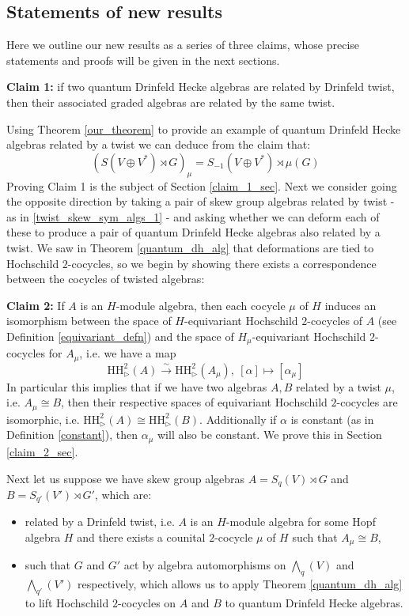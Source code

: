 \documentclass[10pt]{article}
\newcommand{\bb}{\medbreak}
\newcommand{\nt}{\noindent}
\newcommand{\xrt}{\xrightarrow}
\newcommand{\HH}{\text{HH}}
\newcommand{\definex}[1]{\textbf{#1}}
\theoremstyle{definition}
\begin{document}
\subsection{Statements of new results}\label{new_results_sec}

Here we outline our new results as a series of three claims, whose precise statements and proofs will be given in the next sections.\bb

\nt \definex{Claim 1:} if two quantum Drinfeld Hecke algebras are related by Drinfeld twist, then their associated graded algebras are related by the same twist.\bb

\nt Using Theorem \ref{our_theorem} to provide an example of quantum Drinfeld Hecke algebras related by a twist we can deduce from the claim that:
\begin{equation}\label{twist_skew_sym_algs_1}
(S(V\oplus V^*)\rtimes G)_\mu=S_{-1}(V\oplus V^*)\rtimes \mu(G)
\end{equation}
Proving Claim 1 is the subject of Section \ref{claim_1_sec}. Next we consider going the opposite direction by taking a pair of skew group algebras related by twist - as in \eqref{twist_skew_sym_algs_1} - and asking whether we can deform each of these to produce a pair of quantum Drinfeld Hecke algebras also related by a twist. We saw in Theorem \ref{quantum_dh_alg} that deformations are tied to Hochschild $2$-cocycles, so we begin by showing there exists a correspondence between the cocycles of twisted algebras:\bb

\nt \definex{Claim 2:} If $A$ is an $H$-module algebra, then each cocycle $\mu$ of $H$ induces an isomorphism between the space of $H$-equivariant Hochschild $2$-cocycles of $A$ (see Definition \ref{equivariant_defn}) and the space of $H_\mu$-equivariant Hochschild $2$-cocycles for $A_\mu$, i.e. we have a map
\begin{equation}\label{cocycle_map}
\HH_\rhd^2(A)\xrt{\sim} \HH_\rhd^2(A_\mu),\ [\alpha]\mapsto [\alpha_\mu]
\end{equation}
In particular this implies that if we have two algebras $A,B$ related by a twist $\mu$, i.e. $A_\mu\cong B$, then their respective spaces of equivariant Hochschild $2$-cocycles are isomorphic, i.e. $\HH_\rhd^2(A)\cong \HH_\rhd^2(B)$. Additionally if $\alpha$ is constant (as in Definition \ref{constant}), then $\alpha_\mu$ will also be constant. We prove this in Section \ref{claim_2_sec}.\bb

\nt Next let us suppose we have skew group algebras $A=S_q(V)\rtimes G$ and $B=S_{q'}(V')\rtimes G'$, which are:
\begin{itemize}
  \item related by a Drinfeld twist, i.e. $A$ is an $H$-module algebra for some Hopf algebra $H$ and there exists a counital $2$-cocycle $\mu$ of $H$ such that $A_\mu\cong B$,
  
  \item such that $G$ and $G'$ act by algebra automorphisms on $\bigwedge_q(V)$ and $\bigwedge_{q'}(V')$ respectively, which allows us to apply Theorem \ref{quantum_dh_alg} to lift Hochschild $2$-cocycles on $A$ and $B$ to quantum Drinfeld Hecke algebras.
\end{itemize}
\end{document}
